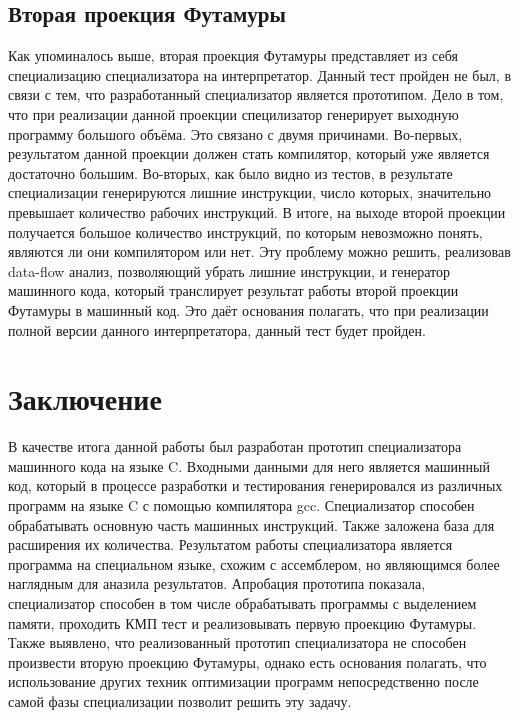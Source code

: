 \subsection{Вторая проекция Футамуры}
Как упоминалось выше, вторая проекция Футамуры представляет из себя специализацию специализатора на интерпретатор. Данный тест пройден не был, в связи с тем, что разработанный специализатор является прототипом. Дело в том, что при реализации данной проекции специлизатор генерирует выходную программу большого объёма. Это связано с двумя причинами. Во-первых, результатом данной проекции должен стать компилятор, который уже является достаточно большим. Во-вторых, как было видно из тестов, в результате специализации генерируются лишние инструкции, число которых, значительно превышает количество рабочих инструкций. В итоге, на выходе второй проекции получается большое количество инструкций, по которым невозможно понять, являются ли они компилятором или нет. Эту проблему можно решить, реализовав data-flow анализ, позволяющий убрать лишние инструкции, и генератор машинного кода, который транслирует результат работы второй проекции Футамуры в машинный код. Это даёт основания полагать, что при реализации полной версии данного интерпретатора, данный тест будет пройден.


\section{Заключение}
В качестве итога данной работы был разработан прототип специализатора машинного кода на языке \textsf{C}. Входными данными для него является машинный код, который в процессе разработки и тестирования генерировался из различных программ на языке \textsf{C} с помощью компилятора gcc. Специализатор способен обрабатывать основную часть машинных инструкций. Также заложена база для расширения их количества. Результатом работы специализатора является программа на специальном языке, схожим с ассемблером, но являющимся более наглядным для аназила результатов. Апробация прототипа показала, специализатор способен в том числе обрабатывать программы с выделением памяти, проходить КМП тест и реализовывать первую проекцию Футамуры.
Также выявлено, что реализованный прототип специализатора не способен произвести вторую проекцию Футамуры,
однако есть основания полагать, что использование других техник оптимизации программ непосредственно после самой фазы специализации
позволит решить эту задачу.

